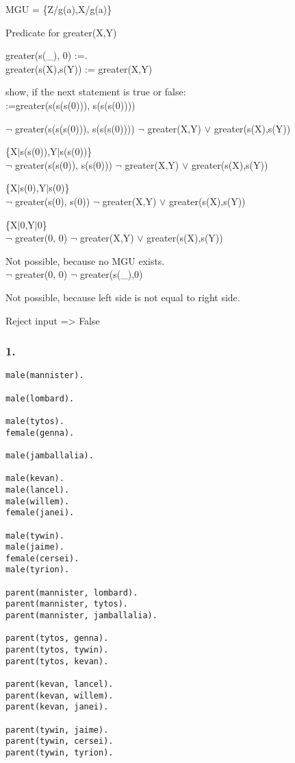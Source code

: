 \documentclass[10pt, a4paper]{article}
\newcommand{\pipe}{$\vert$\hphantom{i}}
\begin{document}
MGU = \{Z/g(a),X/g(a)\}



Predicate for greater(X,Y)

greater(s(\_), 0) :=.\\
greater(s(X),s(Y)) := greater(X,Y)

show, if the next statement is true or false:\\
:=greater(s(s(s(0))), s(s(s(0))))

$\neg$ greater(s(s(s(0))), s(s(s(0)))) \hphantom{00000} $\neg$ greater(X,Y) $\vee$ greater(s(X),s(Y))

\{X\pipe s(s(0)),Y\pipe s(s(0))\}\\

$\neg$ greater(s(s(0)), s(s(0))) \hphantom{00000} $\neg$ greater(X,Y) $\vee$ greater(s(X),s(Y))

\{X\pipe s(0),Y\pipe s(0)\}\\

$\neg$ greater(s(0), s(0)) \hphantom{00000} $\neg$ greater(X,Y) $\vee$ greater(s(X),s(Y))

\{X\pipe 0,Y\pipe 0\}\\

$\neg$ greater(0, 0) \hphantom{00000} $\neg$ greater(X,Y) $\vee$ greater(s(X),s(Y))

Not possible, because no MGU exists.\\

$\neg$ greater(0, 0) \hphantom{00000} $\neg$ greater(s(\_),0)

Not possible, because left side is not equal to right side.

Reject input => False


\setcounter{secnumdepth}{1}
\subsubsection{1.}
\begin{verbatim}
male(mannister).

male(lombard).

male(tytos).
female(genna).

male(jamballalia).

male(kevan).
male(lancel).
male(willem).
female(janei).

male(tywin).
male(jaime).
female(cersei).
male(tyrion).

parent(mannister, lombard).
parent(mannister, tytos).
parent(mannister, jamballalia).

parent(tytos, genna).
parent(tytos, tywin).
parent(tytos, kevan).

parent(kevan, lancel).
parent(kevan, willem).
parent(kevan, janei).

parent(tywin, jaime).
parent(tywin, cersei).
parent(tywin, tyrion).
\end{verbatim}
\end{document}
